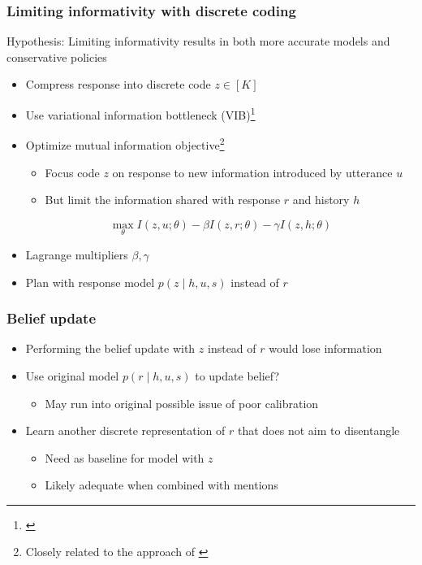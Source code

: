 \documentclass{beamer}
\begin{document}
\begin{frame}
\frametitle{Limiting informativity with discrete coding}
Hypothesis: Limiting informativity results in both more accurate models
    and conservative policies
\begin{itemize}
\item Compress response into discrete code $z \in [K]$
\item Use variational information bottleneck (VIB)\footnote{\citet{vib}}
\item Optimize mutual information objective\footnote{Closely related to the approach of \citet{li}}
    \begin{itemize}
    \item Focus code $z$ on response to new information introduced by utterance $u$
    \item But limit the information shared with response $r$ and history $h$
    \end{itemize}
$$\max_\theta I(z, u; \theta) - \beta I(z, r; \theta) - \gamma I(z, h; \theta)$$
\item Lagrange multipliers $\beta,\gamma$
\item Plan with response model $p(z \mid h, u, s)$ instead of $r$
\end{itemize}
\end{frame}

\begin{frame}
\frametitle{Belief update}
\begin{itemize}
\item Performing the belief update with $z$ instead of $r$ would lose information
\item Use original model $p(r \mid h, u, s)$ to update belief?
    \begin{itemize}
    \item May run into original possible issue of poor calibration
    \end{itemize}
\item Learn another discrete representation of $r$ that does not aim
    to disentangle
    \begin{itemize}
    \item Need as baseline for model with $z$
    \item Likely adequate when combined with mentions
    \end{itemize}
\end{itemize}
\end{frame}
\end{document}
